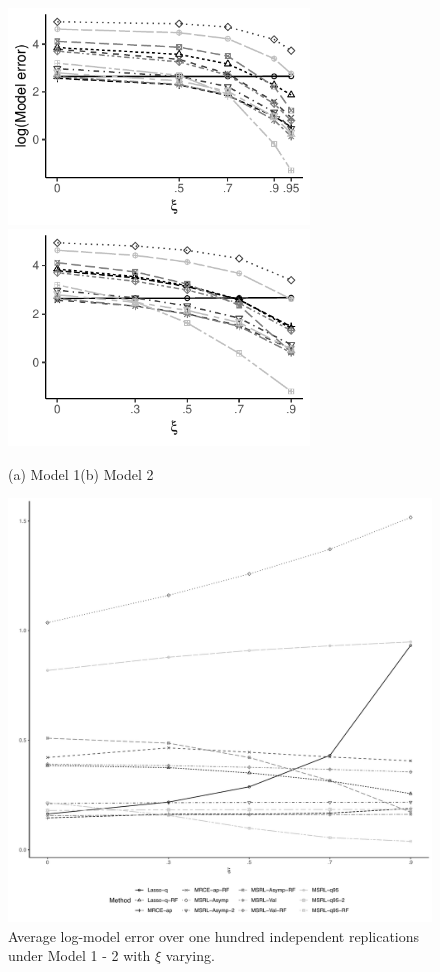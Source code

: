\documentclass[12pt]{article}
\begin{document}
\begin{figure}[t!]
\centerline{\hfill\includegraphics[width=8cm]{Plots/NormalHet_AR1_ModelErr_TP_April.pdf} \hfill \includegraphics[width=8cm]{Plots/NormalHet_Const_ModelErr_TP_April.pdf}\hfill}
\centerline{\hfill (a) Model 1\hfill \quad \hfill (b) Model 2 \hfill}
\centerline{\hfill\includegraphics[width=16cm]{Plots/TP_LegendGet.pdf}\hfill} 
\caption{Average log-model error over one hundred independent replications under Model 1 - 2 with $\xi$ varying.}\label{fig:TP_Results}
\end{figure}
\end{document}
